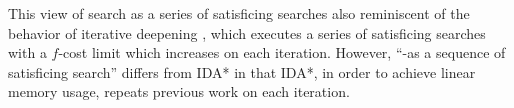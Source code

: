 This view of \astar search as a series of satisficing searches also reminiscent of the behavior of 
iterative deepening \astar \cite{korf1985depth}, which executes a series of satisficing searches with a $f$-cost limit which increases on each iteration. 
However, ``\astar-as a sequence of satisficing search'' differs from IDA* in that IDA*, in order to achieve linear memory usage, repeats previous work on each iteration.

